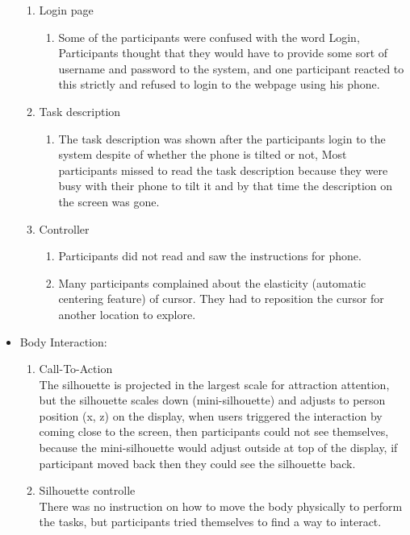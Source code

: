 \begin{itemize}
\begin{enumerate}
\item	Login page
\begin{enumerate}
\item	Some of the participants were confused with the word Login, Participants thought that they would have to provide some sort of username and password to the system, and one participant reacted to this strictly and refused to login to the webpage using his phone.
\end{enumerate}

\item	Task description
\begin{enumerate}
\item	The task description was shown after the participants login to the system despite of whether the phone is tilted or not, Most participants missed to read the task description because they were busy with their phone to tilt it and by that time the description on the screen was gone.
\end{enumerate}

\item	Controller
\begin{enumerate}
\item	Participants did not read and saw the instructions for phone.	
\item	Many participants complained about the elasticity (automatic centering feature) of cursor. They had to reposition the cursor for another location to explore.
\end{enumerate}
\end{enumerate}



\item Body Interaction: \\

\begin{enumerate}
\item	Call-To-Action \\
The silhouette is projected in the largest scale for attraction attention, but the silhouette scales down (mini-silhouette) and adjusts to person position (x, z) on the display, when users triggered the interaction by coming close to the screen, then participants could not see themselves, because the mini-silhouette would adjust outside at top of the display, if participant moved back then they could see the silhouette back. 

\item	Silhouette controlle \\
There was no instruction on how to move the body physically to perform the tasks, but participants tried themselves to find a way to interact.


\end{enumerate}
\end{itemize}
